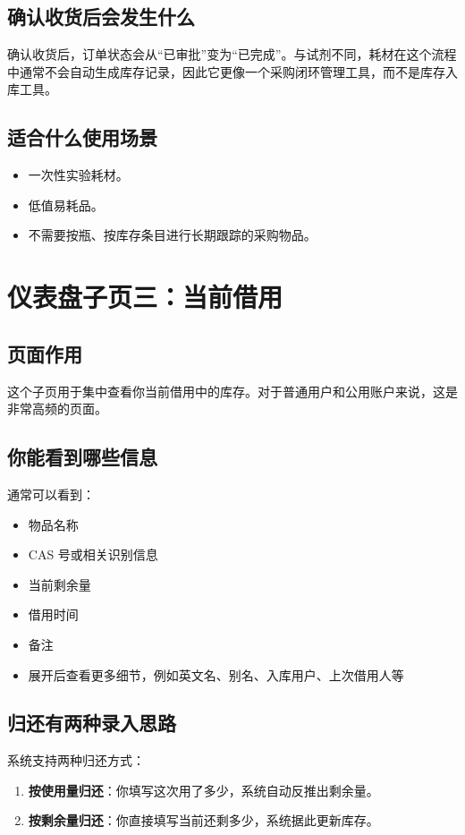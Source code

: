 \documentclass[12pt,a4paper]{ctexart}
\begin{document}
\subsection{确认收货后会发生什么}
确认收货后，订单状态会从“已审批”变为“已完成”。与试剂不同，耗材在这个流程中通常不会自动生成库存记录，因此它更像一个采购闭环管理工具，而不是库存入库工具。

\subsection{适合什么使用场景}
\begin{itemize}
  \item 一次性实验耗材。
  \item 低值易耗品。
  \item 不需要按瓶、按库存条目进行长期跟踪的采购物品。
\end{itemize}

\newpage
\section{仪表盘子页三：当前借用}

\subsection{页面作用}
这个子页用于集中查看你当前借用中的库存。对于普通用户和公用账户来说，这是非常高频的页面。

\subsection{你能看到哪些信息}
通常可以看到：
\begin{itemize}
  \item 物品名称
  \item CAS 号或相关识别信息
  \item 当前剩余量
  \item 借用时间
  \item 备注
  \item 展开后查看更多细节，例如英文名、别名、入库用户、上次借用人等
\end{itemize}

\subsection{归还有两种录入思路}
系统支持两种归还方式：
\begin{enumerate}
  \item \textbf{按使用量归还}：你填写这次用了多少，系统自动反推出剩余量。
  \item \textbf{按剩余量归还}：你直接填写当前还剩多少，系统据此更新库存。
\end{enumerate}
\end{document}
